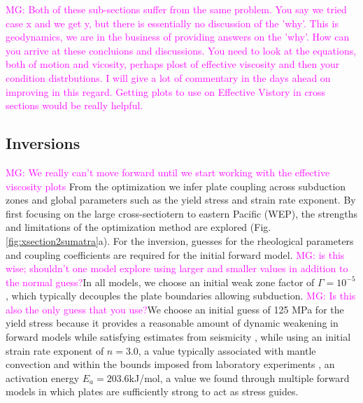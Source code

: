 \documentclass[12pt]{article}
\newcommand{\mgnote}[1]{\textcolor{magenta}{MG: #1}}
\begin{document}
\mgnote{Both of these sub-sections suffer from the same problem. You say we tried case x and we get y, but there is essentially no discussion of the 'why'. This is geodynamics, we are in the business of providing answers on the 'why'. How can you arrive at these concluions and discussions. You need to look at the equations, both of motion and  vicosity, perhaps plost of effective viscosity and then your condition distrbutions. I will give a lot of commentary in the days ahead on improving in this regard. Getting plots to use on Effective Vistory in cross sections would be really helpful.}

\subsection{Inversions}

\mgnote{We really can't move forward until we start working with the effective viscosity plots}
From the optimization we infer plate coupling across subduction zones and global parameters such as the yield stress and strain rate exponent. 
By first focusing on the large cross-sectiotern to eastern Pacific (WEP), the strengths and limitations of the optimization method are explored (Fig.\ref{fig:xsection2sumatra}a).  
For the inversion, guesses for the rheological parameters and coupling coefficients are required for the initial forward model. \mgnote{is this wise; shouldn't one model explore using larger and smaller values in addition to the normal guess?}In all models, we choose an initial weak zone factor of $\Gamma=10^{-5}$, which typically decouples the plate boundaries allowing subduction. \mgnote{Is this also the only guess that you use?}We choose an initial guess of 125 MPa for the yield stress because it provides a reasonable amount of dynamic weakening in forward models while satisfying estimates from seismicity \citep{craig2014reassessment}, while using an initial strain rate exponent of $n=3.0$, a value typically associated with mantle convection and within the bounds imposed from laboratory experiments \citep{ranalli1995rheology}, an activation energy $E_a=203.6$kJ/mol, a value we found through multiple forward models in which plates are sufficiently strong to act as stress guides. %
\end{document}
